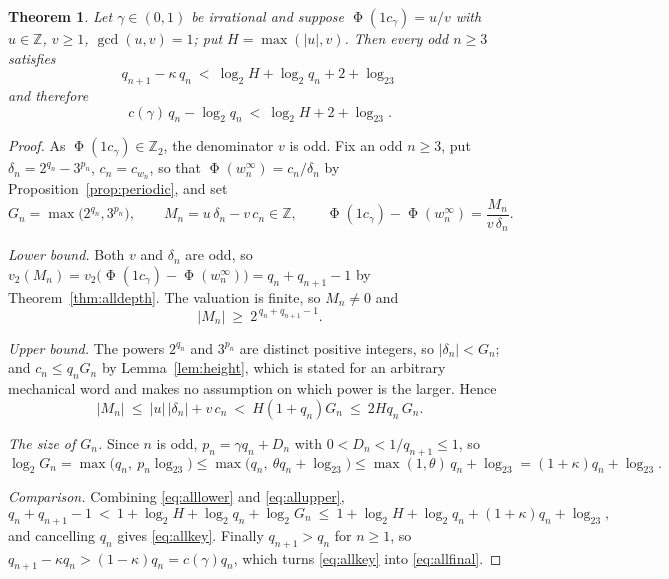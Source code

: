 \documentclass[11pt,reqno]{amsart}
\theoremstyle{plain}
\newtheorem{theorem}{Theorem}[section]
\theoremstyle{definition}
\newcommand{\Zt}{\mathbb{Z}_2}
\newcommand{\Z}{\mathbb{Z}}
\newcommand{\vt}{v_2}
\DeclareMathOperator{\Ph}{\Phi}
\begin{document}
\begin{theorem}\label{thm:allmain}
Let $\gamma\in(0,1)$ be irrational and suppose $\Ph(1c_\gamma)=u/v$ with
$u\in\Z$, $v\ge1$, $\gcd(u,v)=1$; put $H=\max(|u|,v)$. Then every odd $n\ge3$
satisfies
\begin{equation}\label{eq:allkey}
q_{n+1}-\kappa\, q_n\ <\ \log_2H+\log_2q_n+2+\log_23
\end{equation}
and therefore
\begin{equation}\label{eq:allfinal}
c(\gamma)\,q_n-\log_2q_n\ <\ \log_2H+2+\log_23 .
\end{equation}
\end{theorem}

\begin{proof}
As $\Ph(1c_\gamma)\in\Zt$, the denominator $v$ is odd. Fix an odd $n\ge3$, put
$\delta_n=2^{q_n}-3^{p_n}$, $c_n=c_{w_n}$, so that
$\Ph(w_n^\infty)=c_n/\delta_n$ by Proposition~\ref{prop:periodic}, and set
\[
G_n=\max\bigl(2^{q_n},3^{p_n}\bigr),\qquad
M_n=u\,\delta_n-v\,c_n\in\Z,\qquad
\Ph(1c_\gamma)-\Ph(w_n^\infty)=\frac{M_n}{v\,\delta_n}.
\]

\emph{Lower bound.} Both $v$ and $\delta_n$ are odd, so
$\vt(M_n)=\vt\bigl(\Ph(1c_\gamma)-\Ph(w_n^\infty)\bigr)=q_n+q_{n+1}-1$ by
Theorem~\ref{thm:alldepth}. The valuation is finite, so $M_n\ne0$ and
\begin{equation}\label{eq:alllower}
|M_n|\ \ge\ 2^{\,q_n+q_{n+1}-1}.
\end{equation}

\emph{Upper bound.} The powers $2^{q_n}$ and $3^{p_n}$ are distinct positive
integers, so $|\delta_n|<G_n$; and $c_n\le q_nG_n$ by Lemma~\ref{lem:height},
which is stated for an arbitrary mechanical word and makes no assumption on
which power is the larger. Hence
\begin{equation}\label{eq:allupper}
|M_n|\ \le\ |u|\,|\delta_n|+v\,c_n\ <\ H(1+q_n)G_n\ \le\ 2Hq_n\,G_n .
\end{equation}

\emph{The size of $G_n$.} Since $n$ is odd, $p_n=\gamma q_n+D_n$ with
$0<D_n<1/q_{n+1}\le1$, so
\[
\log_2G_n=\max\bigl(q_n,\ p_n\log_23\bigr)
\le\max\bigl(q_n,\ \theta q_n+\log_23\bigr)
\le\max(1,\theta)\,q_n+\log_23=(1+\kappa)q_n+\log_23 .
\]

\emph{Comparison.} Combining \eqref{eq:alllower} and \eqref{eq:allupper},
\[
q_n+q_{n+1}-1\ <\ 1+\log_2H+\log_2q_n+\log_2G_n
\ \le\ 1+\log_2H+\log_2q_n+(1+\kappa)q_n+\log_23 ,
\]
and cancelling $q_n$ gives \eqref{eq:allkey}. Finally $q_{n+1}>q_n$ for $n\ge1$,
so $q_{n+1}-\kappa q_n>(1-\kappa)q_n=c(\gamma)q_n$, which turns
\eqref{eq:allkey} into \eqref{eq:allfinal}.
\end{proof}
\end{document}
